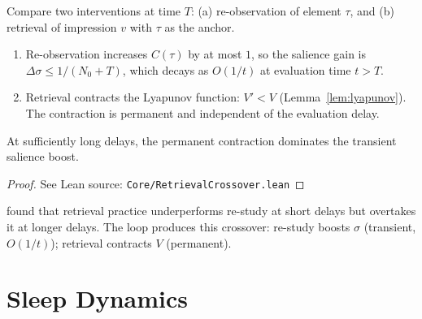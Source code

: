 \begin{corollary}
\label{cor:crossover}
\leanok
{}
Compare two interventions at time $T$: (a) re-observation of element $\tau$, and (b) retrieval of impression $v$ with $\tau$ as the anchor.
\begin{enumerate}
\item Re-observation increases $C(\tau)$ by at most $1$, so the salience gain is $\Delta\sigma \leq 1/(N_0 + T)$, which decays as $O(1/t)$ at evaluation time $t > T$.
\item Retrieval contracts the Lyapunov function: $V' < V$ (Lemma~\ref{lem:lyapunov}).  The contraction is permanent and independent of the evaluation delay.
\end{enumerate}
At sufficiently long delays, the permanent contraction dominates the transient salience boost.
\end{corollary}

\begin{proof}
\leanok
{}
See Lean source: \texttt{Core/RetrievalCrossover.lean}
\end{proof}

\begin{remark}[Crossover]
\label{rem:crossover}
\leanok
{}
\citet{roediger2006} found that retrieval practice underperforms re-study at short delays but overtakes it at longer delays.  The loop produces this crossover: re-study boosts $\sigma$ (transient, $O(1/t)$); retrieval contracts $V$ (permanent).
\end{remark}

\chapter{Sleep Dynamics}\label{ch:sleep}

